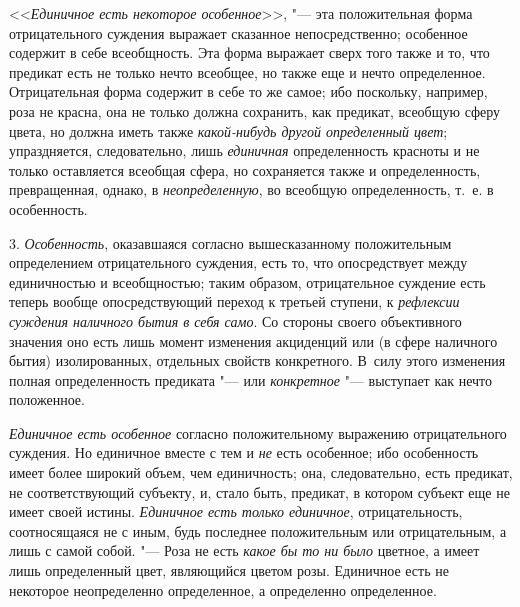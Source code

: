 {<<{\em Единичное есть некоторое
особенное}>>, "--- эта положительная форма отрицательного
суждения выражает сказанное непосредственно; особенное содержит в себе
всеобщность. Эта форма выражает сверх того также и то, что предикат есть не
только нечто всеобщее, но также еще и нечто определенное. Отрицательная
форма содержит в себе то же самое; ибо поскольку, например, роза не красна,
она не только должна сохранить, как предикат, всеобщую сферу цвета, но
должна иметь также {\em какой-нибудь
другой определенный цвет}; упраздняется, следовательно, лишь
{\em единичная}
определенность красноты и не только оставляется всеобщая
сфера, но сохраняется также и определенность, превращенная, однако, в
{\em неопределенную}, во
всеобщую определенность, т.~е. в особенность.

3. {\em Особенность},
оказавшаяся согласно вышесказанному положительным
определением отрицательного суждения, есть то, что опосредствует между
единичностью и всеобщностью; таким образом, отрицательное суждение есть
теперь вообще опосредствующий переход к третьей ступени, к
{\em рефлексии суждения наличного бытия
в себя само}. Со стороны своего объективного значения оно
есть лишь момент изменения акциденций или (в сфере наличного бытия)
изолированных, отдельных свойств конкретного. В~силу этого изменения полная
определенность предиката "--- или
{\em конкретное}
"--- выступает как нечто положенное.

{\em Единичное есть особенное}
согласно положительному выражению отрицательного суждения. Но
единичное вместе с тем и {\em не}
есть особенное; ибо особенность имеет более широкий объем,
чем единичность; она, следовательно, есть предикат, не соответствующий
субъекту, и, стало быть, предикат, в котором субъект еще не имеет своей
истины. {\em Единичное есть только
единичное}, отрицательность, соотносящаяся не с иным, будь
последнее положительным или отрицательным, а лишь с самой собой. "---
Роза не есть {\em какое бы
то ни было} цветное, а имеет лишь определенный цвет,
являющийся цветом розы. Единичное есть не некоторое неопределенно
определенное, а определенно определенное.

}
